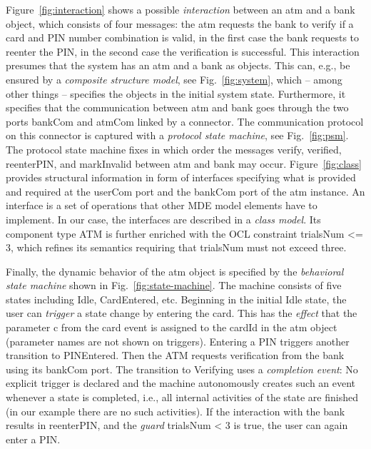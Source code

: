 \documentclass[10pt, a4paper]{isov2}
\renewcommand{\figurerefname}{Figure}
\renewcommand{\fref}[1]{\figurerefname~\ref{#1}}
\newcommand{\uml}[1]{\textsf{#1}}
\begin{document}
\fref{fig:interaction} shows a possible \emph{interaction} between
an \uml{atm} and a \uml{bank} object, which consists of four messages:
the \uml{atm} requests the \uml{bank} to \uml{verify} if a card and PIN
number combination is valid, in the first case the \uml{bank} requests
to reenter the PIN, in the second case the verification is successful.
This interaction presumes that the system has an \uml{atm} and a
\uml{bank} as objects. This can, e.g., be ensured by a \emph{composite
  structure model}, see Fig.~\ref{fig:system}, which -- among other
things -- specifies the objects in the initial system state.
Furthermore, it specifies that the communication between \uml{atm} and
\uml{bank} goes through the two ports \uml{bankCom} and \uml{atmCom}
linked by a connector.  The communication protocol on this connector is
captured with a \emph{protocol state machine}, see Fig.~\ref{fig:psm}.
The protocol state machine fixes in which order the messages
\uml{verify}, \uml{verified}, \uml{reenterPIN}, and \uml{markInvalid}
between \uml{atm} and \uml{bank} may occur.  Figure~\ref{fig:class}
provides structural information in form of interfaces specifying what is
provided and required at the \uml{userCom} port and the \uml{bankCom}
port of the \uml{atm} instance.  An interface is a set of operations
that other MDE model elements have to implement. In our case, the
interfaces are described in a \emph{class model}. Its component type 
\uml{ATM} is further enriched with the OCL
constraint \uml{trialsNum <= 3}, which refines its semantics requiring
that \uml{trialsNum} must not exceed three.

Finally, the dynamic behavior of the \uml{atm} object is specified by
the \emph{behavioral state machine} shown in
Fig.~\ref{fig:state-machine}. The machine consists of five states
including \uml{Idle}, \uml{CardEntered}, etc.  Beginning in the
initial \uml{Idle} state, the user can \emph{trigger} a state change
by entering the \uml{card}. This has the \emph{effect} that the
parameter \uml{c} from the \uml{card} event is assigned to the
\uml{cardId} in the \uml{atm} object (parameter names are not shown on
triggers). Entering a \uml{PIN} triggers another transition to
\uml{PINEntered}.  Then the ATM requests verification from the bank
using its \uml{bankCom} port.  The transition to \uml{Verifying} uses
a \emph{completion event}: No explicit trigger is declared and the
machine autonomously creates such an event whenever a state is
completed, i.e., all internal activities of the state are finished (in
our example there are no such activities).  If the interaction with
the bank results in \uml{reenterPIN}, and the \emph{guard}
\uml{trialsNum < 3} is true, the user can again enter a \uml{PIN}.
\end{document}
